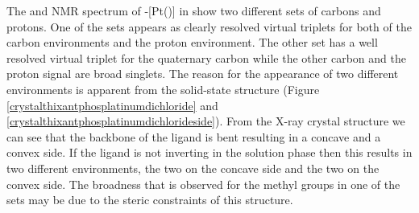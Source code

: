 %
%

The \proton{} and \carbon{} NMR spectrum of \trans-[Pt(\tButhixantphos)] in  show two different sets of \tBu{} carbons and protons.  One of the sets appears as clearly resolved virtual triplets for both of the carbon environments and the proton environment.  The other set has a well resolved virtual triplet for the quaternary carbon while the other carbon and the proton signal are broad singlets.  The reason for the appearance of two different \tBu{} environments is apparent from the solid-state structure (Figure \ref{crystalthixantphosplatinumdichloride} and \ref{crystalthixantphosplatinumdichlorideside}).  From the X-ray crystal structure we can see that the backbone of the \tButhixantphos{} ligand is bent resulting in a concave and a convex side.  If the ligand is not inverting in the solution phase then this results in two different \tBu{} environments, the two on the concave side and the two on the convex side.  The broadness that is observed for the methyl groups in one of the sets may be due to the steric constraints of this structure.  

